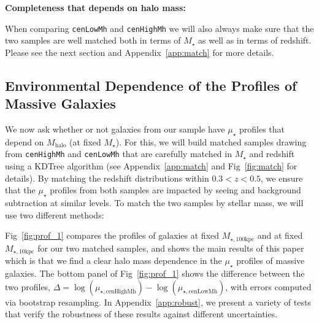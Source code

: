 \documentclass[a4paper,fleqn,usenatbib]{mnras}
\def\rbcg{\texttt{cenHighMh}}
\def\nbcg{\texttt{cenLowMh}}
\def\mstar{{$M_{\star}$}}
\def\mhalo{{$M_{\mathrm{halo}}$}}
\def\minn{{$M_{\star,10\mathrm{kpc}}$}}
\def\mtot{{$M_{\star,100\mathrm{kpc}}$}}
\def\mden{{$\mu_{\star}$}}
\begin{document}
    
    \textbf{Completeness that depends on halo mass:}



    When comparing \nbcg{} and \rbcg{} we will also always make sure that the two 
    samples are well matched both in terms of \mstar{} as well as in terms of redshift. 
    Please see the next section and Appendix~\ref{app:match} for more details.

\subsection{Environmental Dependence of the Profiles of Massive Galaxies}
    \label{ssec:sbp_mtot} 
       
    We now ask whether or not galaxies from our sample have \mden{} profiles that 
    depend on \mhalo{} (at fixed \mstar{}). 
    For this, we will build matched samples drawing from \rbcg{} and \nbcg{} that are 
    carefully matched in \mstar{} and redshift using a KDTree algorithm 
    (see Appendix~\ref{app:match} and Fig~\ref{fig:match} for details). 
    By matching the redshift distributions within $0.3 < z < 0.5$, we ensure that the 
    \mden{} profiles from both samples are impacted by seeing and background subtraction 
    at similar levels. 
    To match the two samples by stellar mass, we will use two different methods:

    Fig~\ref{fig:prof_1} compares the profiles of galaxies at fixed \mtot{} and at fixed 
    \minn{} for our two matched samples, and shows the main results of this paper which 
    is that we find a clear halo mass dependence in the \mden{} profiles of massive 
    galaxies. 
    The bottom panel of Fig~\ref{fig:prof_1} shows the difference between the two 
    profiles, $\Delta = \log(\mu_{\star, \mathrm{cenHighMh}}) - 
    \log(\mu_{\star, \mathrm{cenLowMh}})$, 
    with errors computed via bootstrap resampling. 
    In Appendix~\ref{app:robust}, we present a variety of tests that verify the 
    robustness of these results against different uncertainties.
   
\end{document}
